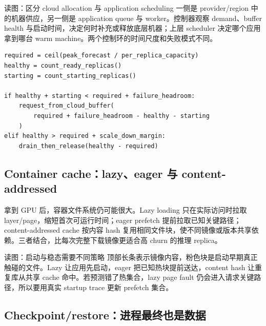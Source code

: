 
\begin{knowledgebox}{读图：区分 cloud allocation 与 application scheduling}
一侧是 provider/region 中的机器供应，另一侧是 application queue 与 worker。控制器观察 demand、buffer health 与启动时间，决定何时补充或释放底层机器；上层 scheduler 决定哪个应用拿到哪台 warm machine。两个控制环的时间尺度和失败模式不同。
\end{knowledgebox}

\begin{lstlisting}[caption={带 headroom 与启动延迟的简化扩容控制器}]
required = ceil(peak_forecast / per_replica_capacity)
healthy = count_ready_replicas()
starting = count_starting_replicas()

if healthy + starting < required + failure_headroom:
    request_from_cloud_buffer(
        required + failure_headroom - healthy - starting
    )
elif healthy > required + scale_down_margin:
    drain_then_release(healthy - required)
\end{lstlisting}

\subsection{Container cache：lazy、eager 与 content-addressed}

拿到 GPU 后，容器文件系统仍可能很大。Lazy loading 只在实际访问时拉取 layer/page，缩短首次可运行时间；eager prefetch 提前拉取已知关键路径；content-addressed cache 按内容 hash 复用相同文件块，使不同镜像或版本共享依赖。三者结合，比每次完整下载镜像更适合高 churn 的推理 replica。


\begin{knowledgebox}{读图：启动与稳态需要不同策略}
顶部长条表示镜像内容，粉色块是启动早期真正触碰的文件。Lazy 让应用先启动，eager 把已知热块提前送达，content hash 让重复库从共享 cache 命中。若预测错了热集合，lazy page fault 仍会进入请求关键路径，所以要用真实 startup trace 更新 prefetch 集合。
\end{knowledgebox}

\subsection{Checkpoint/restore：进程最终也是数据}

